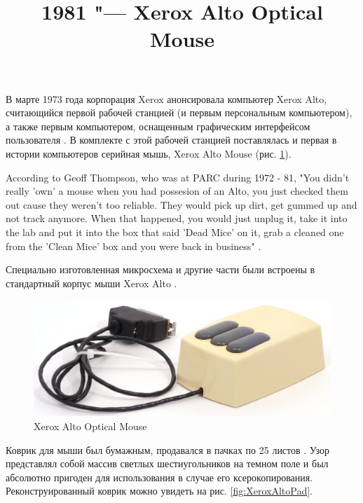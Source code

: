 \documentclass[11pt, a4paper]{article}
\begin{document}
\title{1981 "--- Xerox Alto Optical Mouse}
\date{}
\maketitle
{}
В марте 1973 года корпорация Xerox анонсировала компьютер Xerox Alto, считающийся первой рабочей станцией (и первым персональным компьютером), а также первым компьютером, оснащенным графическим интерфейсом пользователя \cite{wiki}. В комплекте с этой рабочей станцией поставлялась и первая в истории компьютеров серийная мышь, Xerox Alto Mouse (рис. \ref{fig:XeroxAltoPic}).

According to Geoff Thompson, who was at PARC during 1972 - 81, "You didn't really 'own' a mouse when you had possesion of an Alto, you just checked them out cause they weren't too reliable. They would pick up dirt, get gummed up and not track anymore. When that happened, you would just unplug it, take it into the lab and put it into the box that said 'Dead Mice' on it, grab a cleaned one from the 'Clean Mice' box and you were back in business" \cite{mouses}.

Специально изготовленная микросхема и другие части были встроены в стандартный корпус мыши Xerox Alto \cite{vlsi82}.

\begin{figure}[h]
    \centering
    \includegraphics[scale=0.7]{1981_xerox_alto_mouse/pic_30.jpg}
    \caption{Xerox Alto Optical Mouse}
    \label{fig:XeroxAltoPic}
\end{figure}

Коврик для мыши был бумажным, продавался в пачках по 25 листов \cite{pad}. Узор представлял собой массив светлых шестиугольников на темном поле и был абсолютно пригоден для использования в случае его ксерокопирования. Реконструированный коврик можно увидеть на рис. \ref{fig:XeroxAltoPad}.
\end{document}
